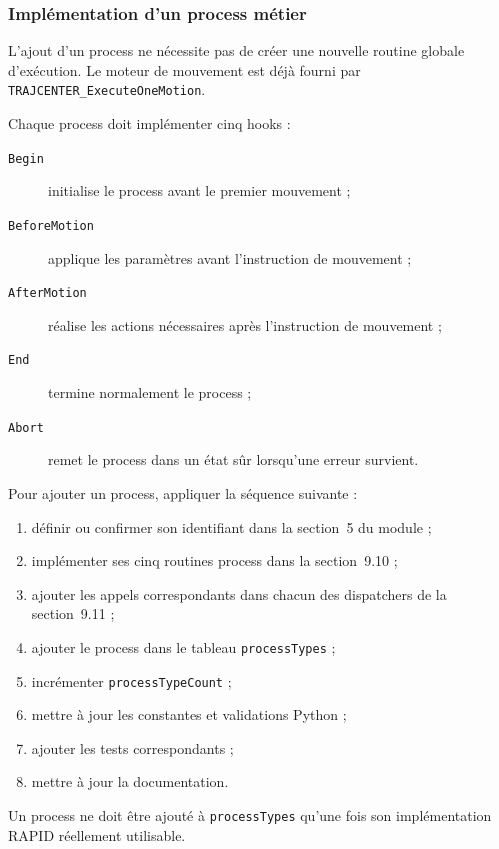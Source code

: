 \documentclass{rapportENSAM}
\begin{document}
\subsubsection{Implémentation d'un process métier}
\label{subsubsec:rapid-custom-process-execution}

L'ajout d'un process ne nécessite pas de créer une nouvelle routine globale
d'exécution. Le moteur de mouvement est déjà fourni par
\texttt{TRAJCENTER\_ExecuteOneMotion}.

Chaque process doit implémenter cinq hooks :

\begin{description}
    \item[\texttt{Begin}] initialise le process avant le premier mouvement ;
    \item[\texttt{BeforeMotion}] applique les paramètres avant l'instruction
    de mouvement ;
    \item[\texttt{AfterMotion}] réalise les actions nécessaires après
    l'instruction de mouvement ;
    \item[\texttt{End}] termine normalement le process ;
    \item[\texttt{Abort}] remet le process dans un état sûr lorsqu'une erreur
    survient.
\end{description}

Pour ajouter un process, appliquer la séquence suivante :

\begin{enumerate}
    \item définir ou confirmer son identifiant dans la section~5 du module ;
    \item implémenter ses cinq routines process dans la section~9.10 ;
    \item ajouter les appels correspondants dans chacun des dispatchers de la
    section~9.11 ;
    \item ajouter le process dans le tableau \texttt{processTypes} ;
    \item incrémenter \texttt{processTypeCount} ;
    \item mettre à jour les constantes et validations Python ;
    \item ajouter les tests correspondants ;
    \item mettre à jour la documentation.
\end{enumerate}

Un process ne doit être ajouté à \texttt{processTypes} qu'une fois son
implémentation RAPID réellement utilisable.
\end{document}

